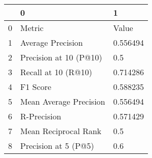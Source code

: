 \begin{tabular}{lll}
\toprule
{} &                       0 &         1 \\
\midrule
0 &                  Metric &     Value \\
1 &       Average Precision &  0.556494 \\
2 &  Precision at 10 (P@10) &       0.5 \\
3 &     Recall at 10 (R@10) &  0.714286 \\
4 &                F1 Score &  0.588235 \\
5 &  Mean Average Precision &  0.556494 \\
6 &             R-Precision &  0.571429 \\
7 &    Mean Reciprocal Rank &       0.5 \\
8 &    Precision at 5 (P@5) &       0.6 \\
\bottomrule
\end{tabular}
